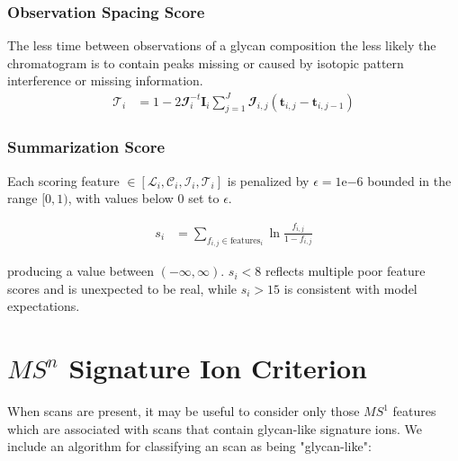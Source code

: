 \documentclass{article}
\begin{document}
    \subsubsection{Observation Spacing Score}
        The less time between observations of a glycan composition the less likely the chromatogram
        is to contain peaks missing or caused by isotopic pattern interference or missing information.
        \begin{align}
            \mathscr{T}_i &= 1 - 2\mathbfcal{I}_i^{-t}\mathbf{I}_i\sum_{j=1}^J\mathbfcal{I}_{i, j}(
                \mathbf{t}_{i, j} - \mathbf{t}_{i, j - 1})
        \end{align}

    \subsubsection{Summarization Score}
        Each scoring feature $\in \left[\mathscr{L}_i, \mathscr{C}_i, \mathscr{I}_i,
        \mathscr{T}_i\right]$ is penalized by $\epsilon = 1\mathrm{e}{-6}$ bounded in
        the range $[0, 1)$, with values below 0 set to $\epsilon$.

        \begin{align}
            s_i &= \sum_{f_{i,j} \in \text{features}_i}{\ln{
                \frac{f_{i, j}}{1 - f_{i, j}}
                }
            }
        \end{align}

        \noindent producing a value between $(-\infty, \infty)$. $s_i < 8$ reflects multiple
        poor feature scores and is unexpected to be real, while $s_i > 15$ is
        consistent with model expectations.

\section{$MS^n$ Signature Ion Criterion}\label{sec:signature_ion_criterion}
    When \msn scans are present, it  may be useful to consider only those $MS^1$
    features which are associated with \msn scans that contain glycan-like signature
    ions. We include an algorithm for classifying an \msn scan as being "glycan-like":
\end{document}
